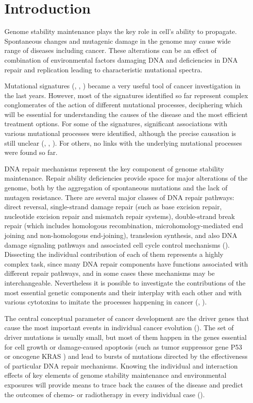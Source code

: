 \documentclass[12pt,a4paper,oneside]{article}
\begin{document}
\pagestyle{empty}
\section{Introduction}

Genome stability maintenance plays the key role in cell’s ability to propagate. Spontaneous changes and mutagenic damage in the genome may cause wide range of diseases including cancer. These alterations can be an effect of combination of environmental factors damaging DNA and deficiencies in DNA repair and replication leading to characteristic mutational spectra.

Mutational signatures (\cite{Alex1}, \cite{Alex2}, \cite{NZ}) became a very useful tool of cancer investigation in the last years. However, most of the signatures identified so far represent complex conglomerates of the action of different mutational processes, deciphering which will be essential for understanding the causes of the disease and the most efficient treatment options. For some of the signatures, significant associations with various mutational processes were identified, although the precise causation is still unclear (\cite{Alex1}, \cite{Alex3}, \cite{Helleday}). For others, no links with the underlying mutational processes were found so far. 

DNA repair mechanisms represent the key component of genome stability maintenance. Repair ability deficiencies provide space for major alterations of the genome, both by the aggregation of spontaneous mutations and the lack of mutagen resistance. There are several major classes of DNA repair pathways: direct reversal, single-strand damage repair (such as base excision repair, nucleotide excision repair and mismatch repair systems), double-strand break repair (which includes homologous recombination, microhomology-mediated end joining and non-homologous end-joining), translesion synthesis, and also DNA damage signaling pathways and associated cell cycle control mechanisms (\cite{DNArepair}). Dissecting the individual contribution of each of them represents a highly complex task, since many DNA repair components have functions associated with different repair pathways, and in some cases these mechanisms may be interchangeable. Nevertheless it is possible to investigate the contributions of the most essential genetic components and their interplay with each other and with various cytotoxins to imitate the processes happening in cancer (\cite{Helleday}, \cite{Wu}).

The central conceptual parameter of cancer development are the driver genes that cause the most important events in individual cancer evolution (\cite{Stratton}). The set of driver mutations is usually small, but most of them happen in the genes essential for cell growth or damage-caused apoptosis (such as tumor suppressor gene P53 \cite{p53} or oncogene KRAS \cite{KRAS}) and lead to bursts of mutations directed by the effectiveness of particular DNA repair mechanisms. Knowing the individual and interaction effects of key elements of genome stability maintenance and environmental exposures will provide means to trace back the causes of the disease and predict the outcomes of chemo- or radiotherapy in every individual case (\cite{Poon2}).
\end{document}
